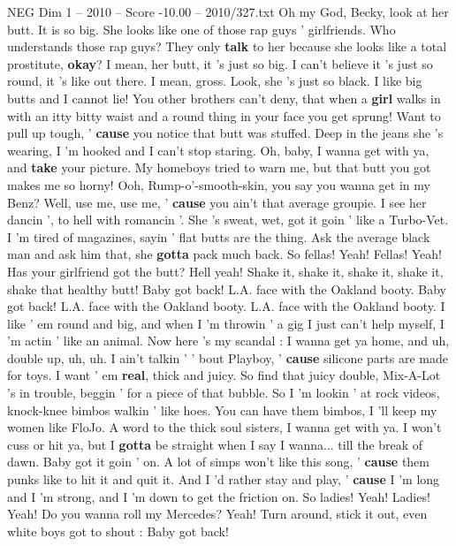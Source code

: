 \begin{textsample}{NEG Dim 1 – 2010 – Score -10.00 – 2010/327.txt}  \label{ex:f1_neg_024}
Oh my God, Becky, look at her butt.
It is so big.
She looks like one of those rap guys ' girlfriends.
Who understands those rap guys?
They only \textbf{talk} to her because she looks like a total prostitute, \textbf{okay}?
I mean, her butt, it 's just so big.
I can't believe it 's just so round, it 's like out there.
I mean, gross.
Look, she 's just so black.
I like big butts and I cannot lie!
You other brothers can't deny, that when a \textbf{girl} walks in with an itty bitty waist and a round thing in your face you get sprung!
Want to pull up tough, ' \textbf{cause} you notice that butt was stuffed.
Deep in the jeans she 's wearing, I 'm hooked and I can't stop staring.
Oh, baby, I wanna get with ya, and \textbf{take} your picture.
My homeboys tried to warn me, but that butt you got makes me so horny!
Ooh, Rump-o'-smooth-skin, you say you wanna get in my Benz?
Well, use me, use me, ' \textbf{cause} you ain't that average groupie.
I see her dancin ', to hell with romancin '.
She 's sweat, wet, got it goin ' like a Turbo-Vet.
I 'm tired of magazines, sayin ' flat butts are the thing.
Ask the average black man and ask him that, she \textbf{gotta} pack much back.
So fellas!
Yeah!
Fellas!
Yeah!
Has your girlfriend got the butt?
Hell yeah!
Shake it, shake it, shake it, shake it, shake that healthy butt!
Baby got back!
L.A. face with the Oakland booty.
Baby got back!
L.A. face with the Oakland booty.
L.A. face with the Oakland booty.
I like ' em round and big, and when I 'm throwin ' a gig I just can't help myself, I 'm actin ' like an animal.
Now here 's my scandal : I wanna get ya home, and uh, double up, uh, uh.
I ain't talkin ' ' bout Playboy, ' \textbf{cause} silicone parts are made for toys.
I want ' em \textbf{real}, thick and juicy.
So find that juicy double, Mix-A-Lot 's in trouble, beggin ' for a piece of that bubble.
So I 'm lookin ' at rock videos, knock-knee bimbos walkin ' like hoes.
You can have them bimbos, I 'll keep my women like FloJo.
A word to the thick soul sisters, I wanna get with ya.
I won't cuss or hit ya, but I \textbf{gotta} be straight when I say I wanna... till the break of dawn.
Baby got it goin ' on.
A lot of simps won't like this song, ' \textbf{cause} them punks like to hit it and quit it.
And I 'd rather stay and play, ' \textbf{cause} I 'm long and I 'm strong, and I 'm down to get the friction on.
So ladies!
Yeah!
Ladies!
Yeah!
Do you wanna roll my Mercedes?
Yeah!
Turn around, stick it out, even white boys got to shout : Baby got back!

\end{textsample}
